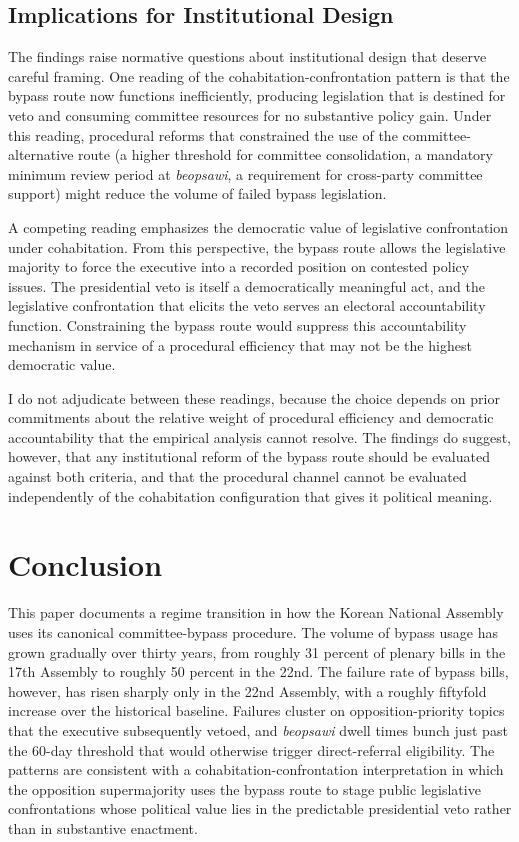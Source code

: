 \documentclass[11pt]{article}
\begin{document}
\subsection{Implications for Institutional Design}

The findings raise normative questions about institutional design that deserve careful framing. One reading of the cohabitation-confrontation pattern is that the bypass route now functions inefficiently, producing legislation that is destined for veto and consuming committee resources for no substantive policy gain. Under this reading, procedural reforms that constrained the use of the committee-alternative route (a higher threshold for committee consolidation, a mandatory minimum review period at \textit{beopsawi}, a requirement for cross-party committee support) might reduce the volume of failed bypass legislation.

A competing reading emphasizes the democratic value of legislative confrontation under cohabitation. From this perspective, the bypass route allows the legislative majority to force the executive into a recorded position on contested policy issues. The presidential veto is itself a democratically meaningful act, and the legislative confrontation that elicits the veto serves an electoral accountability function. Constraining the bypass route would suppress this accountability mechanism in service of a procedural efficiency that may not be the highest democratic value.

I do not adjudicate between these readings, because the choice depends on prior commitments about the relative weight of procedural efficiency and democratic accountability that the empirical analysis cannot resolve. The findings do suggest, however, that any institutional reform of the bypass route should be evaluated against both criteria, and that the procedural channel cannot be evaluated independently of the cohabitation configuration that gives it political meaning.

\section{Conclusion}

This paper documents a regime transition in how the Korean National Assembly uses its canonical committee-bypass procedure. The volume of bypass usage has grown gradually over thirty years, from roughly 31 percent of plenary bills in the 17th Assembly to roughly 50 percent in the 22nd. The failure rate of bypass bills, however, has risen sharply only in the 22nd Assembly, with a roughly fiftyfold increase over the historical baseline. Failures cluster on opposition-priority topics that the executive subsequently vetoed, and \textit{beopsawi} dwell times bunch just past the 60-day threshold that would otherwise trigger direct-referral eligibility. The patterns are consistent with a cohabitation-confrontation interpretation in which the opposition supermajority uses the bypass route to stage public legislative confrontations whose political value lies in the predictable presidential veto rather than in substantive enactment.
\end{document}
